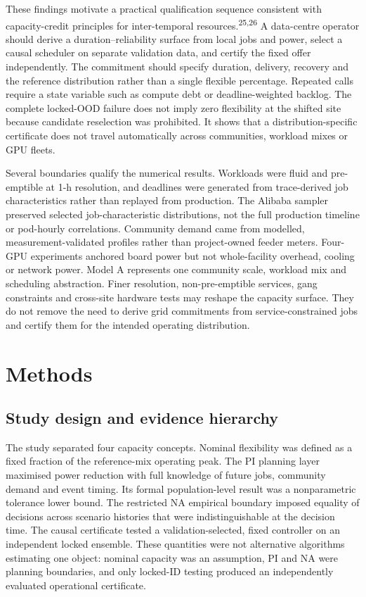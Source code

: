 \documentclass[10pt,a4paper]{article}
\begin{document}
These findings motivate a practical qualification sequence consistent with capacity-credit principles for inter-temporal resources.\textsuperscript{25,26} A data-centre operator should derive a duration–reliability surface from local jobs and power, select a causal scheduler on separate validation data, and certify the fixed offer independently. The commitment should specify duration, delivery, recovery and the reference distribution rather than a single flexible percentage. Repeated calls require a state variable such as compute debt or deadline-weighted backlog. The complete locked-OOD failure does not imply zero flexibility at the shifted site because candidate reselection was prohibited. It shows that a distribution-specific certificate does not travel automatically across communities, workload mixes or GPU fleets.


Several boundaries qualify the numerical results. Workloads were fluid and pre-emptible at 1-h resolution, and deadlines were generated from trace-derived job characteristics rather than replayed from production. The Alibaba sampler preserved selected job-characteristic distributions, not the full production timeline or pod-hourly correlations. Community demand came from modelled, measurement-validated profiles rather than project-owned feeder meters. Four-GPU experiments anchored board power but not whole-facility overhead, cooling or network power. Model A represents one community scale, workload mix and scheduling abstraction. Finer resolution, non-pre-emptible services, gang constraints and cross-site hardware tests may reshape the capacity surface. They do not remove the need to derive grid commitments from service-constrained jobs and certify them for the intended operating distribution.


\clearpage
\section*{Methods}

\subsection*{Study design and evidence hierarchy}

The study separated four capacity concepts. Nominal flexibility was defined as a fixed fraction of the reference-mix operating peak. The PI planning layer maximised power reduction with full knowledge of future jobs, community demand and event timing. Its formal population-level result was a nonparametric tolerance lower bound. The restricted NA empirical boundary imposed equality of decisions across scenario histories that were indistinguishable at the decision time. The causal certificate tested a validation-selected, fixed controller on an independent locked ensemble. These quantities were not alternative algorithms estimating one object: nominal capacity was an assumption, PI and NA were planning boundaries, and only locked-ID testing produced an independently evaluated operational certificate.
\end{document}
